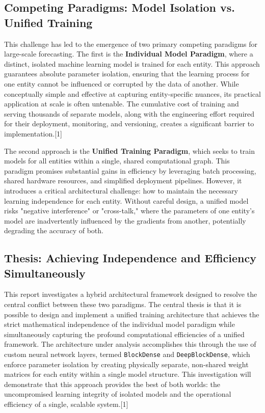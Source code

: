 \documentclass{article}
\begin{document}
\subsection{Competing Paradigms: Model Isolation vs. Unified Training}

This challenge has led to the emergence of two primary competing paradigms for large-scale forecasting. The first is the \textbf{Individual Model Paradigm}, where a distinct, isolated machine learning model is trained for each entity. This approach guarantees absolute parameter isolation, ensuring that the learning process for one entity cannot be influenced or corrupted by the data of another. While conceptually simple and effective at capturing entity-specific nuances, its practical application at scale is often untenable. The cumulative cost of training and serving thousands of separate models, along with the engineering effort required for their deployment, monitoring, and versioning, creates a significant barrier to implementation.[1]

The second approach is the \textbf{Unified Training Paradigm}, which seeks to train models for all entities within a single, shared computational graph. This paradigm promises substantial gains in efficiency by leveraging batch processing, shared hardware resources, and simplified deployment pipelines. However, it introduces a critical architectural challenge: how to maintain the necessary learning independence for each entity. Without careful design, a unified model risks "negative interference" or "cross-talk," where the parameters of one entity's model are inadvertently influenced by the gradients from another, potentially degrading the accuracy of both.

\subsection{Thesis: Achieving Independence and Efficiency Simultaneously}

This report investigates a hybrid architectural framework designed to resolve the central conflict between these two paradigms. The central thesis is that it is possible to design and implement a unified training architecture that achieves the strict mathematical independence of the individual model paradigm while simultaneously capturing the profound computational efficiencies of a unified framework. The architecture under analysis accomplishes this through the use of custom neural network layers, termed \texttt{BlockDense} and \texttt{DeepBlockDense}, which enforce parameter isolation by creating physically separate, non-shared weight matrices for each entity within a single model structure. This investigation will demonstrate that this approach provides the best of both worlds: the uncompromised learning integrity of isolated models and the operational efficiency of a single, scalable system.[1]
\end{document}
